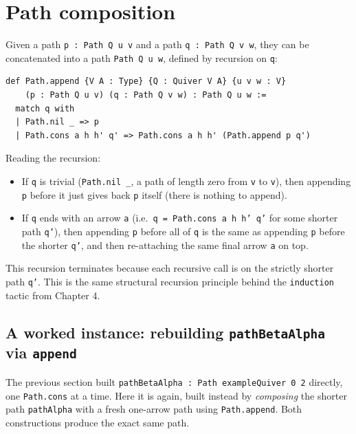 \section{Path composition}\label{sec:11-path-algebras:05-path-composition:1}

Given a path \texttt{p : Path Q u v} and a path \texttt{q : Path Q v w}, they can be concatenated into a path \texttt{Path Q u w}, defined by recursion on \texttt{q}:

\begin{lstlisting}
def Path.append {V A : Type} {Q : Quiver V A} {u v w : V}
    (p : Path Q u v) (q : Path Q v w) : Path Q u w :=
  match q with
  | Path.nil _ => p
  | Path.cons a h h' q' => Path.cons a h h' (Path.append p q')
\end{lstlisting}

Reading the recursion:

\begin{itemize}
\tightlist
\item
  If \texttt{q} is trivial (\texttt{Path.nil \_\allowbreak{}}, a path of length zero from \texttt{v} to \texttt{v}), then appending \texttt{p} before it just gives back \texttt{p} itself (there is nothing to append).
\item
  If \texttt{q} ends with an arrow \texttt{a} (i.e.~\texttt{q = Path.cons a h h' q'} for some shorter path \texttt{q'}), then appending \texttt{p} before all of \texttt{q} is the same as appending \texttt{p} before the shorter \texttt{q'}, and then re-attaching the same final arrow \texttt{a} on top.
\end{itemize}

This recursion terminates because each recursive call is on the strictly shorter path \texttt{q'}. This is the same structural recursion principle behind the \texttt{induction} tactic from Chapter 4.

\subsection{\texorpdfstring{A worked instance: rebuilding \texttt{pathBetaAlpha} via \texttt{append}}{A worked instance: rebuilding pathBetaAlpha via append}}\label{sec:11-path-algebras:05-path-composition:2}

The previous section built \texttt{pathBetaAlpha : Path exampleQuiver 0 2} directly, one \texttt{Path.cons} at a time. Here it is again, built instead by \emph{composing} the shorter path \texttt{pathAlpha} with a fresh one-arrow path using \texttt{Path.append}. Both constructions produce the exact same path.

